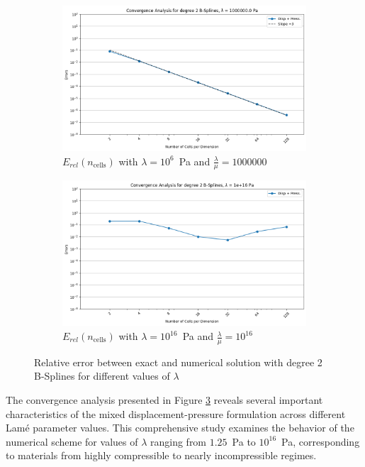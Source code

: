 \documentclass[a4paper,12pt,twoside]{report}
\begin{document}
\begin{figure}[!h]
\begin{subfigure}[b]{0.49\textwidth}
		\includegraphics[width=\textwidth]{figures/figures_mixed_DH/sum_convergence_plot_degree_2_lambda=1000000.0.png}
		\caption{$E_{rel}(n_{\text{cells}})$ with $\lambda = 10^6$~Pa and $\frac{\lambda}{\mu} = 1000000$}
		\label{fig:convergencedegree2mixeddirichlethomogeneouslambda1000000}
	\end{subfigure}
		\begin{subfigure}[b]{0.49\textwidth}
		\centering
		\includegraphics[width=\textwidth]{figures/figures_mixed_DH/sum_convergence_plot_degree_2_lambda=1e+16.png}
		\caption{$E_{rel}(n_{\text{cells}})$ with $\lambda = 10^{16}$~Pa and $\frac{\lambda}{\mu} = 10^{16}$}
		\label{fig:convergencedegree2mixeddirichlethomogeneouslambda1e16}
	\end{subfigure}
	\caption{Relative error between exact and numerical solution with degree 2 B-Splines for different values of $\lambda$}
	\label{fig:convergencedegree2mixeddirichlethomogeneous}
\end{figure}


The convergence analysis presented in Figure \ref{fig:convergencedegree2mixeddirichlethomogeneous} reveals several important characteristics of the mixed displacement-pressure formulation across different Lamé parameter values. This comprehensive study examines the behavior of the numerical scheme for values of $\lambda$ ranging from $1.25$~Pa to $10^{16}$~Pa, corresponding to materials from highly compressible to nearly incompressible regimes.
\end{document}
